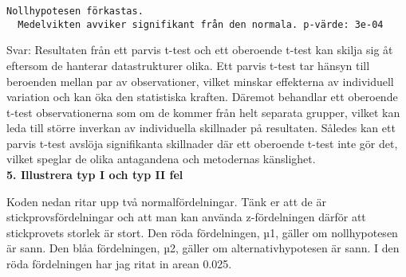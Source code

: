 \documentclass[
  letterpaper,
  DIV=11,
  numbers=noendperiod]{scrartcl}
\begin{document}
\begin{verbatim}
Nollhypotesen förkastas.
  Medelvikten avviker signifikant från den normala. p-värde: 3e-04
\end{verbatim}

\hfill\break
Svar: Resultaten från ett parvis t-test och ett oberoende t-test kan
skilja sig åt eftersom de hanterar datastrukturer olika. Ett parvis
t-test tar hänsyn till beroenden mellan par av observationer, vilket
minskar effekterna av individuell variation och kan öka den statistiska
kraften. Däremot behandlar ett oberoende t-test observationerna som om
de kommer från helt separata grupper, vilket kan leda till större
inverkan av individuella skillnader på resultaten. Således kan ett
parvis t-test avslöja signifikanta skillnader där ett oberoende t-test
inte gör det, vilket speglar de olika antagandena och metodernas
känslighet.\\

\textbf{5. Illustrera typ I och typ II fel}

Koden nedan ritar upp två normalfördelningar. Tänk er att de är
stickprovsfördelningar och att man kan använda z-fördelningen därför att
stickprovets storlek är stort. Den röda fördelningen, µ1, gäller om
nollhypotesen är sann. Den blåa fördelningen, µ2, gäller om
alternativhypotesen är sann. I den röda fördelningen har jag ritat in
arean 0.025.
\end{document}

